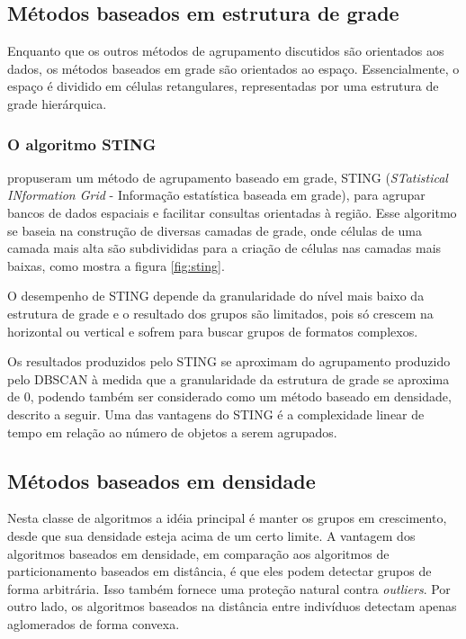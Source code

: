 \subsection{Métodos baseados em estrutura de grade}
Enquanto que os outros métodos de agrupamento discutidos são orientados aos dados, os métodos baseados em grade são orientados ao espaço. Essencialmente, o espaço é dividido em células retangulares, representadas por uma estrutura de grade hierárquica.

\subsubsection{O algoritmo STING}
\cite{Wang1997} propuseram um método de agrupamento baseado em grade, STING (\emph{STatistical INformation Grid} - Informação estatística baseada em grade), para agrupar bancos de dados espaciais e facilitar consultas orientadas à região. Esse algoritmo se baseia na construção de diversas camadas de grade, onde células de uma camada mais alta são subdivididas para a criação de células nas camadas mais baixas, como mostra a figura \ref{fig:sting}.

\begin{figure}[!ht]
	\centering	
\end{figure}

O desempenho de STING depende da granularidade do nível mais baixo da estrutura de grade e o resultado dos
grupos são limitados, pois só crescem na horizontal ou vertical e sofrem para buscar grupos de formatos complexos.

Os resultados produzidos pelo STING se aproximam do agrupamento produzido pelo
DBSCAN à medida que a granularidade da estrutura de grade se aproxima de 0, podendo
também ser considerado como um método baseado em densidade, descrito a seguir.
Uma das vantagens do STING é a complexidade linear de tempo em relação ao número de objetos a serem agrupados.

\subsection{Métodos baseados em densidade}
Nesta classe de algoritmos a idéia principal é manter os grupos em crescimento, desde que sua densidade esteja acima de um certo limite. A vantagem dos algoritmos baseados em densidade, em comparação aos algoritmos de particionamento baseados em distância, é que eles podem detectar grupos de forma arbitrária. Isso também fornece uma proteção natural contra \textit{outliers}. Por outro lado, os algoritmos baseados na distância entre indivíduos detectam apenas aglomerados de forma convexa.

